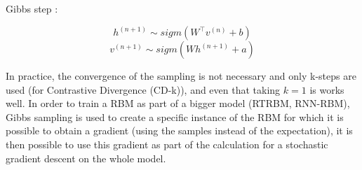 Gibbs step : 

$$h^{(n+1)} \sim sigm(W^\top v^{(n)} + b )$$
$$v^{(n+1)} \sim sigm(W h^{(n+1)} + a )$$

In practice, the convergence of the sampling is not necessary and only k-steps are used (for Contrastive Divergence (CD-k)), and even that taking $k=1$ is works well.
In order to train a RBM as part of a bigger model (RTRBM, RNN-RBM), Gibbs sampling is used to create a specific instance of the RBM for which it is possible to obtain a gradient (using the samples instead of the expectation), it is then possible to use this gradient as part of the calculation for a stochastic gradient descent on the whole model.
